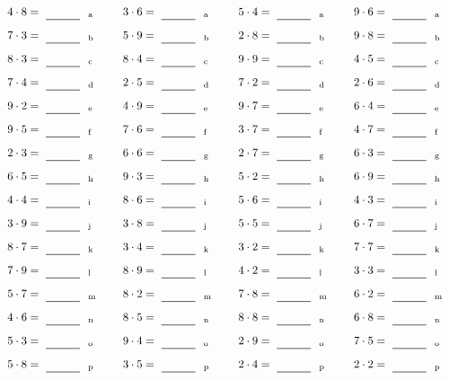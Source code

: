 \documentclass
[
  draft    = true,
  fontsize = 11pt,
  parskip  = half-
]
{scrartcl}
\begin{document}
\par\vfill\par
\begin{align*}
    \pline{4\cdot8}&=\rline{a}
  & \pline{3\cdot6}&=\rline{a}
  & \pline{5\cdot4}&=\rline{a}
  & \pline{9\cdot6}&=\rline{a} \\[1ex]
    \pline{7\cdot3}&=\rline{b}
  & \pline{5\cdot9}&=\rline{b}
  & \pline{2\cdot8}&=\rline{b}
  & \pline{9\cdot8}&=\rline{b} \\[1ex]
    \pline{8\cdot3}&=\rline{c}
  & \pline{8\cdot4}&=\rline{c}
  & \pline{9\cdot9}&=\rline{c}
  & \pline{4\cdot5}&=\rline{c} \\[1ex]
    \pline{7\cdot4}&=\rline{d}
  & \pline{2\cdot5}&=\rline{d}
  & \pline{7\cdot2}&=\rline{d}
  & \pline{2\cdot6}&=\rline{d} \\[1ex]
    \pline{9\cdot2}&=\rline{e}
  & \pline{4\cdot9}&=\rline{e}
  & \pline{9\cdot7}&=\rline{e}
  & \pline{6\cdot4}&=\rline{e} \\[1ex]
    \pline{9\cdot5}&=\rline{f}
  & \pline{7\cdot6}&=\rline{f}
  & \pline{3\cdot7}&=\rline{f}
  & \pline{4\cdot7}&=\rline{f} \\[1ex]
    \pline{2\cdot3}&=\rline{g}
  & \pline{6\cdot6}&=\rline{g}
  & \pline{2\cdot7}&=\rline{g}
  & \pline{6\cdot3}&=\rline{g} \\[1ex]
    \pline{6\cdot5}&=\rline{h}
  & \pline{9\cdot3}&=\rline{h}
  & \pline{5\cdot2}&=\rline{h}
  & \pline{6\cdot9}&=\rline{h} \\[1ex]
    \pline{4\cdot4}&=\rline{i}
  & \pline{8\cdot6}&=\rline{i}
  & \pline{5\cdot6}&=\rline{i}
  & \pline{4\cdot3}&=\rline{i} \\[1ex]
    \pline{3\cdot9}&=\rline{j}
  & \pline{3\cdot8}&=\rline{j}
  & \pline{5\cdot5}&=\rline{j}
  & \pline{6\cdot7}&=\rline{j} \\[1ex]
    \pline{8\cdot7}&=\rline{k}
  & \pline{3\cdot4}&=\rline{k}
  & \pline{3\cdot2}&=\rline{k}
  & \pline{7\cdot7}&=\rline{k} \\[1ex]
    \pline{7\cdot9}&=\rline{l}
  & \pline{8\cdot9}&=\rline{l}
  & \pline{4\cdot2}&=\rline{l}
  & \pline{3\cdot3}&=\rline{l} \\[1ex]
    \pline{5\cdot7}&=\rline{m}
  & \pline{8\cdot2}&=\rline{m}
  & \pline{7\cdot8}&=\rline{m}
  & \pline{6\cdot2}&=\rline{m} \\[1ex]
    \pline{4\cdot6}&=\rline{n}
  & \pline{8\cdot5}&=\rline{n}
  & \pline{8\cdot8}&=\rline{n}
  & \pline{6\cdot8}&=\rline{n} \\[1ex]
    \pline{5\cdot3}&=\rline{o}
  & \pline{9\cdot4}&=\rline{o}
  & \pline{2\cdot9}&=\rline{o}
  & \pline{7\cdot5}&=\rline{o} \\[1ex]
    \pline{5\cdot8}&=\rline{p}
  & \pline{3\cdot5}&=\rline{p}
  & \pline{2\cdot4}&=\rline{p}
  & \pline{2\cdot2}&=\rline{p}
\end{align*}
\end{document}
